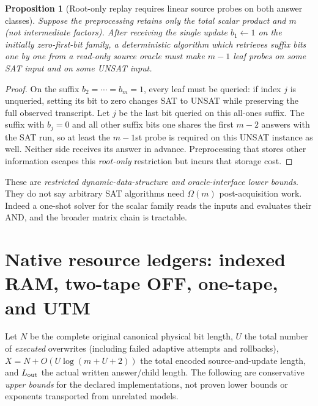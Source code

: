 \documentclass[11pt]{article}
\newtheorem{proposition}[theorem]{Proposition}
\begin{document}
\begin{proposition}[Root-only replay requires linear source probes on both answer classes]\label{prop:probes}
Suppose the preprocessing retains only the total scalar product and $m$ (not intermediate factors). After receiving the single update $b_1\gets1$ on the initially zero-first-bit family, a deterministic algorithm which retrieves suffix bits one by one from a read-only source oracle must make $m-1$ leaf probes on some SAT input and on some UNSAT input.
\end{proposition}
\begin{proof}
On the suffix $b_2=\cdots=b_m=1$, every leaf must be queried: if index $j$ is unqueried, setting its bit to zero changes SAT to UNSAT while preserving the full observed transcript. Let $j$ be the last bit queried on this all-ones suffix. The suffix with $b_j=0$ and all other suffix bits one shares the first $m-2$ answers with the SAT run, so at least the $m-1$st probe is required on this UNSAT instance as well. Neither side receives its answer in advance. Preprocessing that stores other information escapes this \emph{root-only} restriction but incurs that storage cost.
\end{proof}

These are \emph{restricted dynamic-data-structure and oracle-interface lower bounds}. They do not say arbitrary SAT algorithms need $\Omega(m)$ post-acquisition work. Indeed a one-shot solver for the scalar family reads the inputs and evaluates their AND, and the broader matrix chain is tractable.

\section{Native resource ledgers: indexed RAM, two-tape OFF, one-tape, and UTM}
Let $N$ be the complete original canonical physical bit length, $U$ the total number of \emph{executed} overwrites (including failed adaptive attempts and rollbacks), $X=N+O(U\log(m+U+2))$ the total encoded source-and-update length, and $L_{\rm out}$ the actual written answer/child length. The following are conservative \emph{upper bounds} for the declared implementations, not proven lower bounds or exponents transported from unrelated models.
\end{document}
